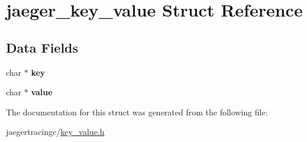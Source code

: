 \hypertarget{structjaeger__key__value}{}\section{jaeger\+\_\+key\+\_\+value Struct Reference}
\label{structjaeger__key__value}
\subsection*{Data Fields}
\begin{DoxyCompactItemize}
\item 
\mbox{\label{structjaeger__key__value_a0c8d3423ffabd9b686aa0c7abd6889d4}} 
char $\ast$ {\bfseries key}
\item 
\mbox{\label{structjaeger__key__value_ab79cc266eb0080ecb608b57896ad4037}} 
char $\ast$ {\bfseries value}
\end{DoxyCompactItemize}


The documentation for this struct was generated from the following file\+:\begin{DoxyCompactItemize}
\item 
jaegertracingc/\mbox{\hyperlink{key__value_8h}{key\+\_\+value.\+h}}\end{DoxyCompactItemize}

